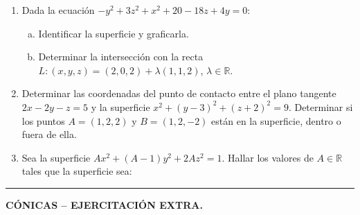 \documentclass[11pt]{article}
\begin{document}
\begin{enumerate}[\hspace{-5mm}$1)$]
\item Dada la ecuación $-y^2 + 3z^2 + x^2 + 20 - 18z + 4y = 0$:
\begin{enumerate}[a)]
\item Identificar la superficie y graficarla.
\item Determinar la intersección con la recta $L: (x, y, z) = (2, 0, 2) + \lambda(1, 1, 2)$, $\lambda \in \mathbb{R}$.
\end{enumerate}





\item Determinar las coordenadas del punto de contacto entre el plano tangente $2x - 2y - z = 5$ y la superficie $x^2 + (y - 3)^2 + (z + 2)^2 = 9$. Determinar si los puntos $A = (1, 2, 2)$ y $B = (1, 2, -2)$ están en la superficie, dentro o fuera de ella.





\item Sea la superficie $Ax^2 + (A - 1)y^2 + 2Az^2 = 1$. Hallar los valores de $A \in \mathbb{R}$ tales que la superficie sea:
\begin{enumerate}[a)]
\end{enumerate}

\end{enumerate}




\hrule 

\medskip

{\large \bf CÓNICAS – EJERCITACIÓN EXTRA.}
\end{document}
